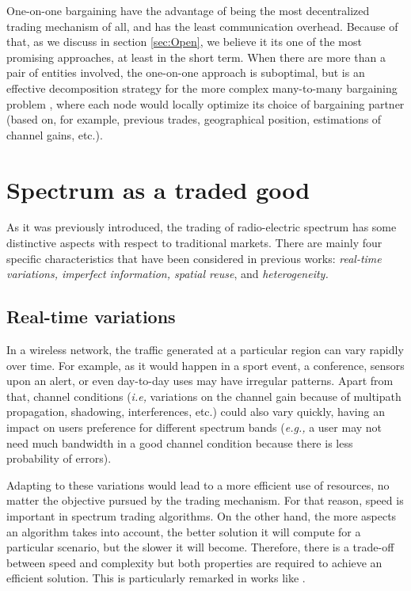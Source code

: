 One-on-one bargaining have the advantage of being the most decentralized trading mechanism of all, and has the least communication overhead. Because of that, as we discuss in section \ref{sec:Open}, we believe it its one of the most promising approaches, at least in the short term. When there are more than a pair of entities involved, the one-on-one approach is suboptimal, but is an effective decomposition strategy for the more complex many-to-many bargaining problem \cite{ref:Yan2012}, where each node would locally optimize its choice of bargaining partner (based on, for example, previous trades, geographical position, estimations of channel gains, etc.). 		

\section{Spectrum as a traded good}
\label{sec:TradedGood}
As it was previously introduced, the trading of radio-electric spectrum has some distinctive aspects with respect to traditional markets. There are mainly four specific characteristics that have been considered in previous works: \textit{real-time variations, imperfect information, spatial reuse}, and \textit{heterogeneity.}

\subsection{Real-time variations}
\label{subsec:Real}
In a wireless network, the traffic generated at a particular region can vary rapidly over time. For example, as it would happen in a sport event, a conference, sensors upon an alert, or even day-to-day uses may have irregular patterns. Apart from that, channel conditions (\textit{i.e,} variations on the channel gain because of multipath propagation, shadowing, interferences, etc.) could also vary quickly, having an impact on users preference for different spectrum bands (\textit{e.g.,} a user may not need much bandwidth in a good channel condition because there is less probability of errors). 

Adapting to these variations would lead to a more efficient use of resources, no matter the objective pursued by the trading mechanism. For that reason, speed is important in spectrum trading algorithms. On the other hand, the more aspects an algorithm takes into account, the better solution it will compute for a particular scenario, but the slower it will become. Therefore, there is a trade-off between speed and complexity but both properties are required to achieve an efficient solution. This is particularly remarked in works like \cite{ref:Zhou2008,ref:Gandhi2008}.

